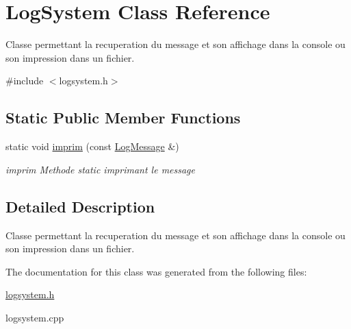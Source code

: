 \hypertarget{class_log_system}{\section{Log\-System Class Reference}
\label{class_log_system}
}


Classe permettant la recuperation du message et son affichage dans la console ou son impression dans un fichier.  




{\ttfamily \#include $<$logsystem.\-h$>$}

\subsection*{Static Public Member Functions}
\begin{DoxyCompactItemize}
\item 
\hypertarget{class_log_system_afd08de0648abbd5a466bed35bc4f8fa0}{static void \hyperlink{class_log_system_afd08de0648abbd5a466bed35bc4f8fa0}{imprim} (const \hyperlink{class_log_message}{Log\-Message} \&)}\label{class_log_system_afd08de0648abbd5a466bed35bc4f8fa0}

\begin{DoxyCompactList}\small\item\em imprim Methode static imprimant le message \end{DoxyCompactList}\end{DoxyCompactItemize}


\subsection{Detailed Description}
Classe permettant la recuperation du message et son affichage dans la console ou son impression dans un fichier. 

The documentation for this class was generated from the following files\-:\begin{DoxyCompactItemize}
\item 
\hyperlink{logsystem_8h}{logsystem.\-h}\item 
logsystem.\-cpp\end{DoxyCompactItemize}
